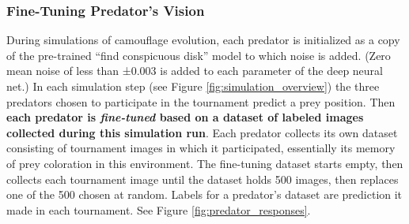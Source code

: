 \documentclass[letterpaper]{article}
\newcommand{\jargon}[1]{\textit{#1}}
\begin{document}
\subsubsection{Fine-Tuning Predator's Vision}
During simulations of camouflage evolution, each predator is initialized as a copy of the pre-trained “find conspicuous disk” model to which noise is added. (Zero mean noise of less than ±0.003 is added to each parameter of the deep neural net.) In each simulation step (see Figure \ref{fig:simulation_overview}) the three predators chosen to participate in the tournament predict a prey position. Then \textbf{each predator is \jargon{fine-tuned} based on a dataset of labeled images collected during this simulation run}. 
Each predator collects its own dataset consisting of tournament images in which it participated, essentially its memory of prey coloration in this environment. The fine-tuning dataset starts empty, then collects each tournament image until the dataset holds 500 images, then replaces one of the 500 chosen at random. Labels for a predator's dataset are prediction it made in each tournament. See Figure \ref{fig:predator_responses}.
\par

\end{document}
